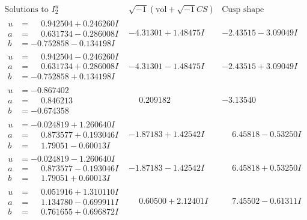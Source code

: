 \documentclass[1p]{elsarticle_modified}
\theoremstyle{definition}
\newcommand{\I}{\sqrt{-1}}
\begin{document}
$$\begin{array}{c|c|c}  
\text{Solutions to }I^u_{2}& \I (\text{vol} + \sqrt{-1}CS) & \text{Cusp shape}\\
 \hline 
\begin{aligned}
u &= \phantom{-}0.942504 + 0.246260 I \\
a &= \phantom{-}0.631734 - 0.286008 I \\
b &= -0.752858 - 0.134198 I\end{aligned}
 & -4.31301 + 1.48475 I & -2.43515 - 3.09049 I \\ \hline\begin{aligned}
u &= \phantom{-}0.942504 - 0.246260 I \\
a &= \phantom{-}0.631734 + 0.286008 I \\
b &= -0.752858 + 0.134198 I\end{aligned}
 & -4.31301 - 1.48475 I & -2.43515 + 3.09049 I \\ \hline\begin{aligned}
u &= -0.867402\phantom{ +0.000000I} \\
a &= \phantom{-}0.846213\phantom{ +0.000000I} \\
b &= -0.674358\phantom{ +0.000000I}\end{aligned}
 & \phantom{-}0.209182\phantom{ +0.000000I} & -3.13540\phantom{ +0.000000I} \\ \hline\begin{aligned}
u &= -0.024819 + 1.260640 I \\
a &= \phantom{-}0.873577 + 0.193046 I \\
b &= \phantom{-}1.79051 - 0.60013 I\end{aligned}
 & -1.87183 + 1.42542 I & \phantom{-}6.45818 - 0.53250 I \\ \hline\begin{aligned}
u &= -0.024819 - 1.260640 I \\
a &= \phantom{-}0.873577 - 0.193046 I \\
b &= \phantom{-}1.79051 + 0.60013 I\end{aligned}
 & -1.87183 - 1.42542 I & \phantom{-}6.45818 + 0.53250 I \\ \hline\begin{aligned}
u &= \phantom{-}0.051916 + 1.310110 I \\
a &= \phantom{-}1.134780 - 0.699911 I \\
b &= \phantom{-}0.761655 + 0.696872 I\end{aligned}
 & \phantom{-}0.60500 + 2.12401 I & \phantom{-}7.45502 - 0.61311 I \\ \hline\begin{aligned}

\end{aligned}
\end{array}$$
\end{document}
